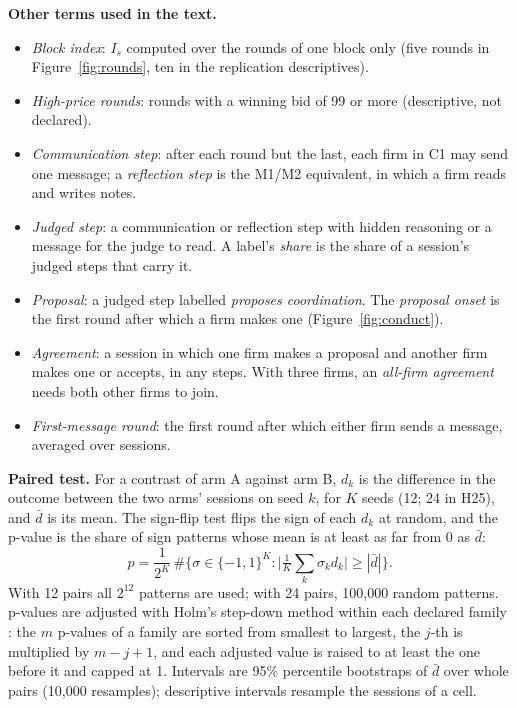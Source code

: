 \documentclass[10pt]{article}
\newcommand{\para}[1]{\textbf{#1}\hspace{0.4em}}
\begin{document}
\para{Other terms used in the text.}
\begin{itemize}[leftmargin=1.5em,itemsep=0pt,topsep=2pt]
\item \emph{Block index}: $I_s$ computed over the rounds of one block only (five rounds in Figure~\ref{fig:rounds}, ten in the replication descriptives).
\item \emph{High-price rounds}: rounds with a winning bid of 99 or more (descriptive, not declared).
\item \emph{Communication step}: after each round but the last, each firm in C1 may send one message; a \emph{reflection step} is the M1/M2 equivalent, in which a firm reads and writes notes.
\item \emph{Judged step}: a communication or reflection step with hidden reasoning or a message for the judge to read. A label's \emph{share} is the share of a session's judged steps that carry it.
\item \emph{Proposal}: a judged step labelled \emph{proposes coordination}. The \emph{proposal onset} is the first round after which a firm makes one (Figure~\ref{fig:conduct}).
\item \emph{Agreement}: a session in which one firm makes a proposal and another firm makes one or accepts, in any steps. With three firms, an \emph{all-firm agreement} needs both other firms to join.
\item \emph{First-message round}: the first round after which either firm sends a message, averaged over sessions.
\end{itemize}

\para{Paired test.} For a contrast of arm A against arm B, $d_k$ is the difference in the outcome between the two arms' sessions on seed $k$, for $K$ seeds (12; 24 in H25), and $\bar d$ is its mean. The sign-flip test flips the sign of each $d_k$ at random, and the p-value is the share of sign patterns whose mean is at least as far from 0 as $\bar d$:
\[
p = \frac{1}{2^K}\,\#\Big\{\sigma \in \{-1, 1\}^K : \Big|\tfrac{1}{K}\textstyle\sum_k \sigma_k d_k\Big| \ge |\bar d|\Big\}.
\]
With 12 pairs all $2^{12}$ patterns are used; with 24 pairs, 100{,}000 random patterns. p-values are adjusted with Holm's step-down method within each declared family \citep{holm1979}: the $m$ p-values of a family are sorted from smallest to largest, the $j$-th is multiplied by $m - j + 1$, and each adjusted value is raised to at least the one before it and capped at 1. Intervals are 95\% percentile bootstraps of $\bar d$ over whole pairs (10{,}000 resamples); descriptive intervals resample the sessions of a cell.
\end{document}
